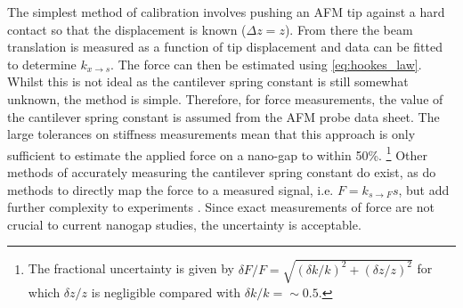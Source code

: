 \documentclass{article}
\begin{document}
The simplest method of calibration involves pushing an AFM tip against a hard contact so that the displacement is known ($\Delta z = z$). From there the beam translation is measured as a function of tip displacement and data can be fitted to determine $k_{x \rightarrow s}$. The force can then be estimated using \eqref{eq:hookes_law}. Whilst this is not ideal as the cantilever spring constant is still somewhat unknown, the method is simple. Therefore, for force measurements, the value of the cantilever spring constant is assumed from the AFM probe data sheet. The large tolerances on stiffness measurements mean that this approach is only sufficient to estimate the applied force on a nano-gap to within 50\%.%
\footnote{The fractional uncertainty is given by  $\delta F/F = \sqrt{(\delta k/k)^2+(\delta z/z)^2}$ for which $\delta z/z$ is negligible compared with $\delta k/k=\sim0.5$.}
Other methods of accurately measuring the cantilever spring constant do exist, as do methods to directly map the force to a measured signal, i.e. $F = k_{s \rightarrow F}s$, but add further complexity to experiments \cite{hutter1993calibration, senden1994experimental, torii1996method, sader1999calibration, levy2002measuring, cumpson2004quantitative, gates2007precise, langlois2007spring, ohler2007cantilever}. Since exact measurements of force are not crucial to current nanogap studies, the uncertainty is acceptable.

\FloatBarrier
\end{document}
